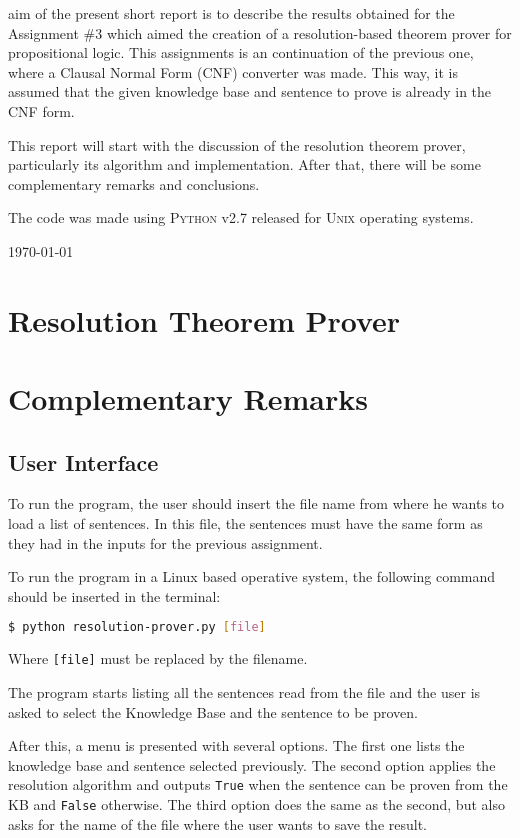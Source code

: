 \documentclass[11pt,journal,compsoc]{IEEEtran}
\begin{document}
 aim of the present short report is to describe the results obtained for the Assignment \#3 which aimed the creation of a resolution-based theorem prover for propositional logic. This assignments is an continuation of the previous one, where a Clausal Normal Form (CNF) converter was made. This way, it is assumed that the given knowledge base and sentence to prove is already in the CNF form.

This report will start with the discussion of the resolution theorem prover, particularly its algorithm and implementation. After that, there will be some complementary remarks and conclusions.

The code was made using \textsc{Python} v2.7 released for \textsc{Unix} operating systems.

\hfill 
 
\hfill \today

\section{Resolution Theorem Prover}



\section{Complementary Remarks}

\subsection{User Interface}

To run the program, the user should insert the file name from where he wants to load a list of sentences. In this file, the sentences must have the same form as they had in the inputs for the previous assignment.

To run the program in a Linux based operative system, the following command should be inserted in the terminal:

\noindent
\begin{lstlisting}[language=bash]
  $ python resolution-prover.py [file]
\end{lstlisting}

Where \texttt{[file]} must be replaced by the filename.

The program starts listing all the sentences read from the file and the user is asked to select the Knowledge Base and the sentence to be proven.

After this, a menu is presented with several options. The first one lists the knowledge base and sentence selected previously. The second option applies the resolution algorithm and outputs \texttt{True} when the sentence can be proven from the KB and \texttt{False} otherwise. The third option does the same as the second, but also asks for the name of the file where the user wants to save the result.
\end{document}
